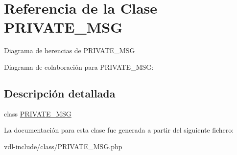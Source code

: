 \hypertarget{class_p_r_i_v_a_t_e___m_s_g}{\section{Referencia de la Clase P\-R\-I\-V\-A\-T\-E\-\_\-\-M\-S\-G}
\label{class_p_r_i_v_a_t_e___m_s_g}
}


Diagrama de herencias de P\-R\-I\-V\-A\-T\-E\-\_\-\-M\-S\-G


Diagrama de colaboración para P\-R\-I\-V\-A\-T\-E\-\_\-\-M\-S\-G\-:


\subsection{Descripción detallada}
class \hyperlink{class_p_r_i_v_a_t_e___m_s_g}{P\-R\-I\-V\-A\-T\-E\-\_\-\-M\-S\-G} 

La documentación para esta clase fue generada a partir del siguiente fichero\-:\begin{DoxyCompactItemize}
\item 
vdl-\/include/class/P\-R\-I\-V\-A\-T\-E\-\_\-\-M\-S\-G.\-php\end{DoxyCompactItemize}
